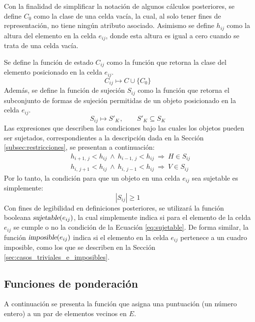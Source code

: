 Con la finalidad de simplificar la notación de algunos cálculos posteriores, se define $C_0$ como la clase de una celda vacía, la cual, al solo tener fines de representación, no tiene ningún atributo asociado.
Asimismo se define $h_{ij}$ como la altura del elemento en la celda $e_{ij}$, donde esta altura es igual a cero cuando se trata de una celda vacía.

Se define la función de estado $C_{ij}$ como la función que retorna la clase del elemento posicionado en la celda $e_{ij}$.
%
\begin{equation}
	C_{ij} \mapsto C \cup \{ C_0 \}
\end{equation}
%
Además, se define la función de sujeción $S_{ij}$ como la función que retorna el subconjunto de formas de sujeción permitidas de un objeto posicionado en la celda $e_{ij}$.
%
\begin{equation}
	S_{ij} \mapsto S'_K \hspace{1pt}, \qquad S'_K \subseteq S_K
\end{equation}
%
Las expresiones que describen las condiciones bajo las cuales los objetos pueden ser sujetados, correspondientes a la descripción dada en la Sección \ref{subsec:restricciones}, se presentan a continuación:
%
\begin{equation}
\label{eq:restricciones}
	\begin{aligned}
		&h_{i+1,\, j} < h_{ij}\ \wedge\ h_{i-1,\, j} < h_{ij}\ \Rightarrow\ H \in S_{ij} \\[0.7em]
		&h_{i,\, j+1} < h_{ij}\ \wedge\ h_{i,\, j-1} < h_{ij}\ \Rightarrow\ V \in S_{ij}
	\end{aligned}
\end{equation}
%
Por lo tanto, la condición para que un objeto en una celda $e_{ij}$ sea sujetable es simplemente:
%
\begin{equation}
\label{eq:sujetable}
	|S_{ij}| \geq 1
\end{equation}
%
Con fines de legibilidad en definiciones posteriores, se utilizará la función booleana $\textsl{sujetable}(e_{ij})$, la cual simplemente indica si para el elemento de la celda $e_{ij}$ se cumple o no la condición de la Ecuación \ref{eq:sujetable}.
De forma similar, la función $\textsl{imposible}(e_{ij})$ indica si el elemento en la celda $e_{ij}$ pertenece a un cuadro imposible, como los que se describen en la Sección \ref{sec:casos_triviales_e_imposibles}.
%
%
\subsection{Funciones de ponderación}
\label{subsec:funciones_ponderacion}
%
%
A continuación se presenta la función que asigna una puntuación (un número entero) a un par de elementos vecinos en $E$.

